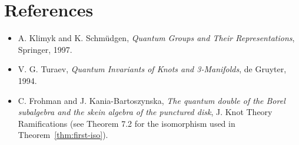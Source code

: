 \documentclass[11pt]{article}
\theoremstyle{definition}
\theoremstyle{remark}
\begin{document}
\section*{References}

\begin{itemize}
\item A. Klimyk and K. Schm\"udgen, \emph{Quantum Groups and Their
Representations}, Springer, 1997.
\item V. G. Turaev, \emph{Quantum Invariants of Knots and 3-Manifolds},
de Gruyter, 1994.
\item C. Frohman and J. Kania-Bartoszynska, \emph{The quantum double of the
Borel subalgebra and the skein algebra of the punctured disk}, J. Knot Theory
Ramifications (see Theorem 7.2 for the isomorphism used in
Theorem~\ref{thm:first-iso}).
\end{itemize}
\end{document}
